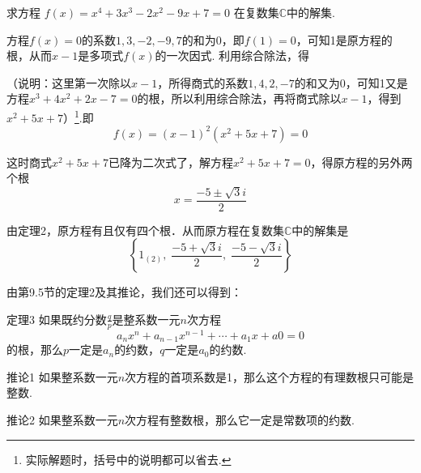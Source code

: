 \begin{example}
    求方程
$f(x)=x^4+3x^3-2x^2-9x+7=0$
在复数集$\mathbb{C}$中的解集.
\end{example}

\begin{solution}
    方程$f(x)=0$的系数$1,3,-2,-9,7$的和为0，即$f(1)=0$，可知1是原方程的根，从而$x-1$是多项式$f(x)$的一次因式. 利用综合除法，得
\begin{center}
\end{center}

（说明：这里第一次除以$x-1$，所得商式的系数$1,4,2,-7$的和又为0，可知1又是方程$x^3+4x^2+2x-7=0$的根，所以利用综合除法，再将商式除以$x-1$，得到$x^2+5x+7$）\footnote{实际解题时，括号中的说明都可以省去.}.即
\[f(x)=(x-1)^2(x^2+5x+7)=0\]

这时商式$x^2+5x+7$已降为二次式了，解方程$x^2+5x+7=0$，得原方程的另外两个根
\[x=\frac{-5\pm\sqrt{3}i}{2}\]

由定理2，原方程有且仅有四个根．从而原方程在复数集$\mathbb{C}$中的解集是
\[\left\{1_{(2)}, \;\frac{-5+\sqrt{3}i}{2},\; \frac{-5-\sqrt{3}i}{2} \right\}\]
\end{solution}

由第9.5节的定理2及其推论，我们还可以得到：

\begin{thm}{定理3}
    如果既约分数$\frac{q}{p}$是整系数一元$n$次方程
\[a_nx^n+a_{n-1}x^{n-1}+\cdots +a_1x+a0=0\]
的根，那么$p$一定是$a_n$的约数，$q$一定是$a_0$的约数.
\end{thm}

\begin{thm}
 {推论1} 如果整系数一元$n$次方程的首项系数是1，那么这个方程的有理数根只可能是整数.   
\end{thm}

\begin{thm}
{推论2} 如果整系数一元$n$次方程有整数根，那么它一定是常数项的约数.    
\end{thm}


